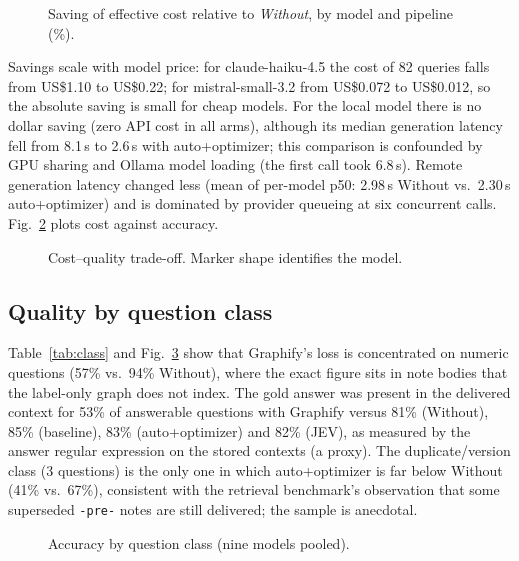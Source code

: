\documentclass[conference,onecolumn,11pt]{IEEEtran}
\begin{document}
\begin{figure}[!htbp]\centering
{}
\caption{Saving of effective cost relative to \emph{Without}, by model and pipeline (\%).}\label{fig:heat}
\end{figure}

Savings scale with model price: for claude-haiku-4.5 the cost of 82 queries falls from US\$1.10 to US\$0.22; for mistral-small-3.2 from US\$0.072 to US\$0.012, so the absolute saving is small for cheap models. For the local model there is no dollar saving (zero API cost in all arms), although its median generation latency fell from 8.1\,s to 2.6\,s with auto+optimizer; this comparison is confounded by GPU sharing and Ollama model loading (the first call took 6.8\,s). Remote generation latency changed less (mean of per-model p50: 2.98\,s Without vs.\ 2.30\,s auto+optimizer) and is dominated by provider queueing at six concurrent calls. Fig.~\ref{fig:pareto} plots cost against accuracy.

\begin{figure}[!htbp]\centering
{}
\caption{Cost--quality trade-off. Marker shape identifies the model.}\label{fig:pareto}
\end{figure}

\subsection{Quality by question class}
Table~\ref{tab:class} and Fig.~\ref{fig:class} show that Graphify's loss is concentrated on numeric questions (57\% vs.\ 94\% Without), where the exact figure sits in note bodies that the label-only graph does not index. The gold answer was present in the delivered context for 53\% of answerable questions with Graphify versus 81\% (Without), 85\% (baseline), 83\% (auto+optimizer) and 82\% (JEV), as measured by the answer regular expression on the stored contexts (a proxy). The duplicate/version class (3 questions) is the only one in which auto+optimizer is far below Without (41\% vs.\ 67\%), consistent with the retrieval benchmark's observation that some superseded \texttt{-pre-} notes are still delivered; the sample is anecdotal.



\begin{figure}[!htbp]\centering
{}
\caption{Accuracy by question class (nine models pooled).}\label{fig:class}
\end{figure}
\end{document}
